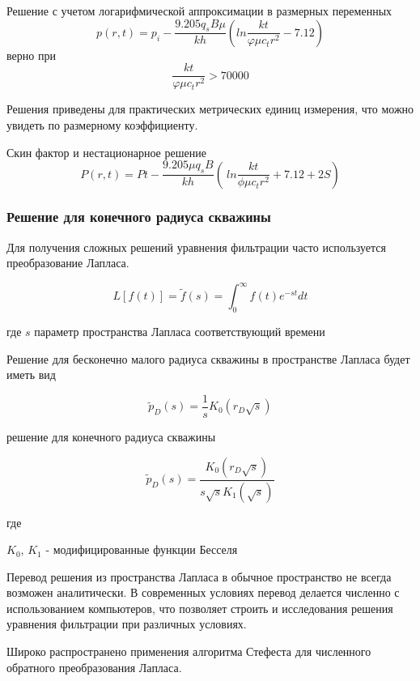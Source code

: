 Решение с учетом логарифмической аппроксимации в размерных переменных
$$ p\left(r,t\right)=p_i-\frac{9.205q_sB\mu}{kh}\left(ln{\frac{kt}{\varphi\mu c_tr^2}}-7.12\right)$$
верно при 
$$\frac{kt}{\varphi\mu c_tr^2}>70000 $$

Решения приведены для практических метрических единиц измерения, что можно увидеть по размерному коэффициенту. 

Скин фактор и нестационарное решение
$$ P(r, t) = P{t} - \frac {9.205\mu {q_s} B }{k h}(\ ln\frac {k t}{ \phi \mu {c_t} {r^2}} +7.12 + 2S) $$





\subsubsection{Решение для конечного радиуса скважины}
Для получения сложных решений уравнения фильтрации часто используется преобразование Лапласа.

$$ L \left [ f(t) \right] = \tilde{f}(s) = \int_{0}^{\infty}f(t)e^{-st}dt $$

где $s$ параметр пространства Лапласа соответствующий времени

Решение для бесконечно малого радиуса скважины в пространстве Лапласа будет иметь вид

$$ \tilde{p}_D(s) = \frac{1}{s} K_0 \left( r_D \sqrt s  \right) $$

решение для конечного радиуса скважины

$$ \tilde{p}_D(s) = \frac{K_0 \left( r_D \sqrt{s}  \right) }{ s \sqrt{s} K_1 \left( \sqrt s  \right)  } $$

где 

$K_0$, $K_1$ - модифицированные функции Бесселя 

Перевод решения из пространства Лапласа в обычное пространство не всегда возможен аналитически. В современных условиях перевод делается численно с использованием компьютеров, что позволяет строить и исследования решения уравнения фильтрации при различных условиях. 

Широко распространено применения алгоритма Стефеста для численного обратного преобразования Лапласа. 